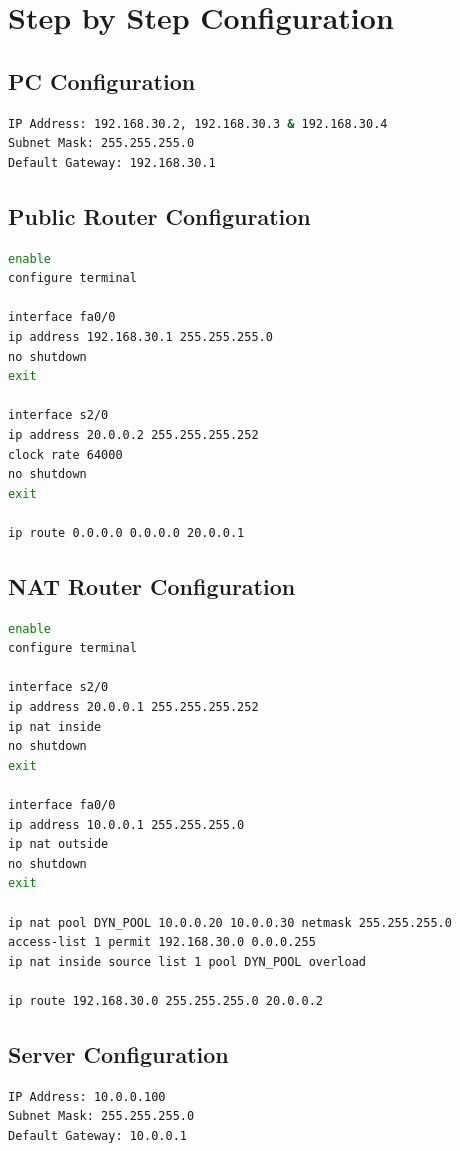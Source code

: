 \documentclass[12pt]{article}
\begin{document}
\section*{Step by Step Configuration}

\subsection{PC Configuration}
\begin{lstlisting}[language=bash]
IP Address: 192.168.30.2, 192.168.30.3 & 192.168.30.4
Subnet Mask: 255.255.255.0
Default Gateway: 192.168.30.1
\end{lstlisting}

\subsection{Public Router Configuration}
\begin{lstlisting}[language=bash]
enable
configure terminal

interface fa0/0
ip address 192.168.30.1 255.255.255.0
no shutdown
exit

interface s2/0
ip address 20.0.0.2 255.255.255.252
clock rate 64000
no shutdown
exit

ip route 0.0.0.0 0.0.0.0 20.0.0.1
\end{lstlisting}

\subsection{NAT Router Configuration}
\begin{lstlisting}[language=bash]
enable
configure terminal

interface s2/0
ip address 20.0.0.1 255.255.255.252
ip nat inside
no shutdown
exit

interface fa0/0
ip address 10.0.0.1 255.255.255.0
ip nat outside
no shutdown
exit

ip nat pool DYN_POOL 10.0.0.20 10.0.0.30 netmask 255.255.255.0
access-list 1 permit 192.168.30.0 0.0.0.255
ip nat inside source list 1 pool DYN_POOL overload

ip route 192.168.30.0 255.255.255.0 20.0.0.2
\end{lstlisting}

\subsection{Server Configuration}
\begin{lstlisting}
IP Address: 10.0.0.100
Subnet Mask: 255.255.255.0
Default Gateway: 10.0.0.1
\end{lstlisting}
\end{document}
